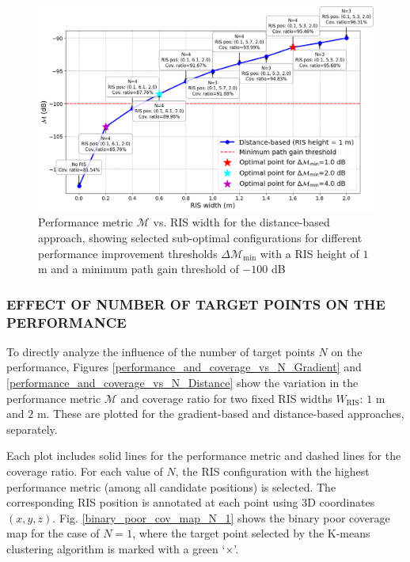 \documentclass{IEEEoj}
\begin{document}
\begin{figure}
	\centering
	\includegraphics[width=\linewidth]{Sim_Results/perf_metric_RIS_width_-100dB_distance_height_1m.png}
	\caption{Performance metric $\mathcal{M}$ vs. RIS width for the distance-based approach, showing selected sub-optimal configurations for different performance improvement thresholds $\Delta \mathcal{M}_{\text{min}}$ with a RIS height of $1$ m and a minimum path gain threshold of $-100$ dB}
	\label{perf_metric_RIS_width_-100dB_distance_height_1m}
\end{figure}

\subsubsection{EFFECT OF NUMBER OF TARGET POINTS ON THE PERFORMANCE}
To directly analyze the influence of the number of target points $N$ on the performance, Figures \ref{performance_and_coverage_vs_N_Gradient} and \ref{performance_and_coverage_vs_N_Distance} show the variation in the performance metric $\mathcal{M}$ and coverage ratio for two fixed RIS widths $W_{\text{RIS}}$: $1$ m and $2$ m. These are plotted for the gradient-based and distance-based approaches, separately.

Each plot includes solid lines for the performance metric and dashed lines for the coverage ratio. For each value of $N$, the RIS configuration with the highest performance metric (among all candidate positions) is selected. The corresponding RIS position is annotated at each point using 3D coordinates $(x, y, z)$. Fig. \ref{binary_poor_cov_map_N_1} shows the binary poor coverage map for the case of $N=1$, where the target point selected by the K-means clustering algorithm is marked with a green `$\times$'.
\end{document}
